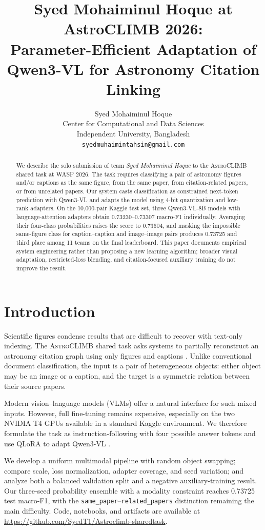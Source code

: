 \documentclass[11pt]{article}
\title{Syed Mohaiminul Hoque at AstroCLIMB 2026:\\
Parameter-Efficient Adaptation of Qwen3-VL for Astronomy Citation Linking}
\author{Syed Mohaiminul Hoque \\
  Center for Computational and Data Sciences \\
  Independent University, Bangladesh \\
  \texttt{syedmuhaimintahsin@gmail.com}}
\newcommand{\task}{\textsc{AstroCLIMB}}
\newcommand{\spclass}{\texttt{same\_paper}}
\newcommand{\rpclass}{\texttt{related\_papers}}
\begin{document}
\maketitle

\begin{abstract}
We describe the solo submission of team \emph{Syed Mohaiminul Hoque} to the \task{} shared task at WASP 2026.  The task requires classifying a pair of astronomy figures and/or captions as the same figure, from the same paper, from citation-related papers, or from unrelated papers.  Our system casts classification as constrained next-token prediction with Qwen3-VL and adapts the model using 4-bit quantization and low-rank adapters.  On the 10,000-pair Kaggle test set, three Qwen3-VL-8B models with language-attention adapters obtain 0.73230--0.73307 macro-F1 individually.  Averaging their four-class probabilities raises the score to 0.73604, and masking the impossible same-figure class for caption--caption and image--image pairs produces 0.73725 and third place among 11 teams on the final leaderboard.  This paper documents empirical system engineering rather than proposing a new learning algorithm; broader visual adaptation, restricted-loss blending, and citation-focused auxiliary training do not improve the result.
\end{abstract}

\section{Introduction}

Scientific figures condense results that are difficult to recover with text-only indexing.  The \task{} shared task asks systems to partially reconstruct an astronomy citation graph using only figures and captions \citep{astroclimb2026}.  Unlike conventional document classification, the input is a pair of heterogeneous objects: either object may be an image or a caption, and the target is a symmetric relation between their source papers.

Modern vision--language models (VLMs) offer a natural interface for such mixed inputs.  However, full fine-tuning remains expensive, especially on the two NVIDIA T4 GPUs available in a standard Kaggle environment.  We therefore formulate the task as instruction-following with four possible answer tokens and use QLoRA \citep{dettmers2023qlora} to adapt Qwen3-VL \citep{bai2025qwen3vl}.

We develop a uniform multimodal pipeline with random object swapping; compare scale, loss normalization, adapter coverage, and seed variation; and analyze both a balanced validation split and a negative auxiliary-training result.  Our three-seed probability ensemble with a modality constraint reaches 0.73725 test macro-F1, with the \spclass{}--\rpclass{} distinction remaining the main difficulty.  Code, notebooks, and artifacts are available at \url{https://github.com/SyedT1/Astroclimb-sharedtask}.
\end{document}
